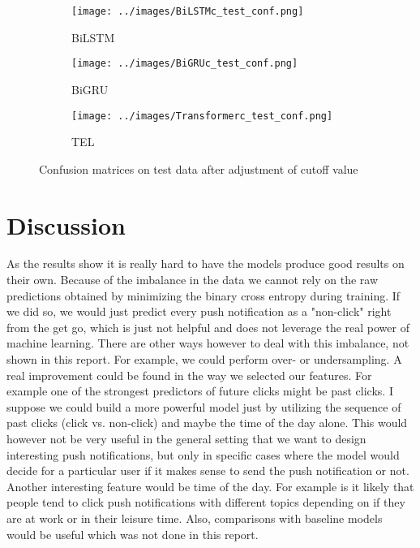 \documentclass[utf8x]{ctexart}
\begin{document}
\begin{figure}[htb]
  \centering
  \begin{subfigure}[b]{0.32\textwidth}
    \centering
    \texttt{[image: ../images/BiLSTMc\_test\_conf.png]}
    \caption{BiLSTM}
    \label{fig:BiLSTMc_test_conf}
  \end{subfigure}
  \begin{subfigure}[b]{0.32\textwidth}
    \centering
    \texttt{[image: ../images/BiGRUc\_test\_conf.png]}
    \caption{BiGRU}
    \label{fig:BiGRUc_test_conf}
  \end{subfigure}
  \begin{subfigure}[b]{0.32\textwidth}
    \centering
    \texttt{[image: ../images/Transformerc\_test\_conf.png]}
    \caption{TEL}
    \label{fig:Transformerc_test_conf}
  \end{subfigure}

  \caption{Confusion matrices on test data after adjustment of cutoff value}
  \label{fig:confadjusted}
\end{figure}



\section{Discussion}

As the results show it is really hard to have the models produce good results on their own. Because of the imbalance in the data we cannot rely on the raw predictions obtained by minimizing the binary cross entropy during training. If we did so, we would just predict every push notification as a "non-click" right from the get go, which is just not helpful and does not leverage the real power of machine learning. There are other ways however to deal with this imbalance, not shown in this report. For example, we could perform over- or undersampling.
A real improvement could be found in the way we selected our features.
For example one of the strongest predictors of future clicks might be past clicks. I suppose we could build a more powerful model just by utilizing the sequence of past clicks (click vs. non-click) and maybe the time of the day alone. This would however not be very useful in the general setting that we want to design interesting push notifications, but only in specific cases where the model would decide for a particular user if it makes sense to send the push notification or not.
Another interesting feature would be time of the day. For example is it likely that people tend to click push notifications with different topics depending on if they are at work or in their leisure time. Also, comparisons with baseline models would be useful which was not done in this report.

% 
% 
\end{document}
